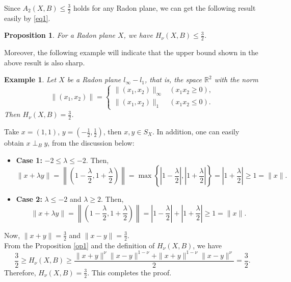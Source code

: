 \documentclass[preprint,12pt]{elsarticle}
\newtheorem{proposition}[thm]{Proposition}
\newtheorem{rem}[thm]{Remark}
\newtheorem{example}{Example}
\numberwithin{equation}{section}
\begin{document}
Since $A_2(X,B)\leq \frac{3}{2}$ holds for any Radon plane, we can get the following result
easily by \eqref{eq1}.
\begin{proposition}\label{op1}
For a Radon plane $X$, we have $H_\nu(X,B)\leq \frac{3}{2}$.
\end{proposition}
Moreover, the following
example will indicate that the upper bound shown in the above result is also sharp.

\begin{example}
Let $X$ be a Radon plane $l_\infty - l_1$, that is, the space $\mathbb{R}^2$ with the norm
\[
\|(x_1, x_2)\| = \begin{cases}
\|(x_1, x_2)\|_\infty & (x_1 x_2 \geq 0), \\
\|(x_1, x_2)\|_1 & (x_1 x_2 \leq 0).
\end{cases}
\]
Then  $H_\nu(X,B)=\frac{3}{2}$.
\end{example}
\proof Take $x = (1,1)$, $y = (-\frac{1}{2}, \frac{1}{2})$, then $x, y \in S_X$. In addition, one can easily
obtain $x \perp_B y$, from the discussion below:
\begin{itemize}
  \item \textbf{Case 1:} $-2\leq \lambda\leq -2$.
  Then,
  \[
  \|x + \lambda y\| = \left\| \left( 1-\frac{\lambda}{2}, 1+\frac{\lambda}{2} \right) \right\| = \max\left\{\left|1-\frac{\lambda}{2}\right|, \left|1+\frac{\lambda}{2}\right|\right\}=\left|1+\frac{\lambda}{2}\right|\geq 1=\|x\|.
  \]
 \item \textbf{Case 2:} $\lambda\leq -2$ and $ \lambda\geq 2$.
  Then,
  \[
\|x + \lambda y\| = \left\| \left( 1-\frac{\lambda}{2}, 1+\frac{\lambda}{2} \right) \right\| = \left|1-\frac{\lambda}{2}\right|+ \left|1+\frac{\lambda}{2}\right|\geq 1=\|x\|.
  \]
\end{itemize}
Now, $\|x+ y\|=\frac{3}{2}$ and $\| x-y\|=\frac{3}{2}$.\\
From the Proposition \eqref{op1} and the definition of $H_\nu(X,B)$, we have
\[
\dfrac{3}{2}\geq H_\nu(X,B) \geq \frac{\|x+y\|^{\nu}\|x-y\|^{1-\nu} + \|x+y\|^{1-\nu}\|x-y\|^{\nu}}{2}=\dfrac{3}{2}.
\]
Therefore, $H_\nu(X,B)=\frac{3}{2}$.
This completes the proof.
\end{document}
